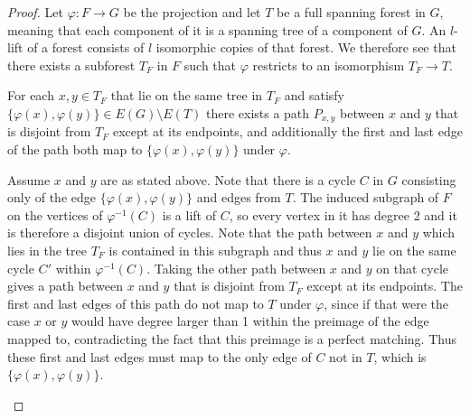 \documentclass[11pt]{article}
\begin{document}
\begin{proof}
    Let $\varphi:F\to G$ be the projection and let $T$ be a full spanning forest in $G$, meaning that each component of it is a spanning tree of a component of $G$. 
    An $l$-lift of a forest consists of $l$ isomorphic copies of that forest. We therefore see that there exists a subforest $T_F$ in $F$ such that $\varphi$ restricts to an isomorphism $T_F \to T$.
    \begin{claim}
    \label{claim:tree-paths}
        For each $x,y \in T_F$ that lie on the same tree in $T_F$ and satisfy $\{\varphi(x), \varphi(y)\} \in E(G) \setminus E(T)$ there exists a path $P_{x,y}$ between $x$ and $y$ that is disjoint from $T_F$ except at its endpoints, and additionally the first and last edge of the path both map to $\{\varphi(x), \varphi(y)\}$ under $\varphi$.
    \end{claim}
    \begin{proofofclaim}
        Assume $x$ and $y$ are as stated above. Note that there is a cycle $C$ in $G$ consisting only of the edge $\{\varphi(x), \varphi(y)\}$ and edges from $T$. The induced subgraph of $F$ on the vertices of $\varphi^{-1}(C)$ is a lift of $C$, so every vertex in it has degree 2 and it is therefore a disjoint union of cycles. Note that the path between $x$ and $y$ which lies in the tree $T_F$ is contained in this subgraph and thus $x$ and $y$ lie on the same cycle $C'$ within $\varphi^{-1}(C)$. Taking the other path between $x$ and $y$ on that cycle gives a path between $x$ and $y$ that is disjoint from $T_F$ except at its endpoints. 
        The first and last edges of this path do not map to $T$ under $\varphi$, since if that were the case $x$ or $y$ would have degree larger than 1 within the preimage of the edge mapped to, contradicting the fact that this preimage is a perfect matching. Thus these first and last edges must map to the only edge of $C$ not in $T$, which is $\{\varphi(x), \varphi(y)\}$.
    \end{proofofclaim}


\end{proof}
\end{document}
